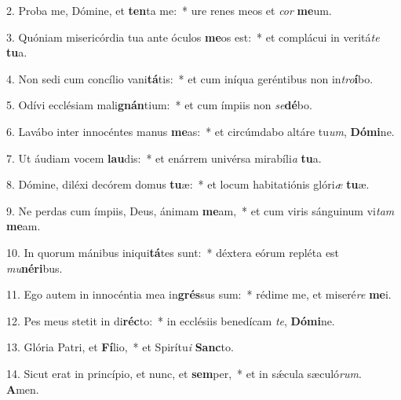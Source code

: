 2. Proba me, Dómine, et \textbf{ten}ta me:~*  ure renes meos et \textit{cor} \textbf{me}um.\

3. Quóniam misericórdia tua ante óculos \textbf{me}os est:~*  et complácui in veritá\textit{te} \textbf{tu}a.\

4. Non sedi cum concílio vani\textbf{tá}tis:~*  et cum iníqua geréntibus non in\textit{tro}\textbf{í}bo.\

5. Odívi ecclésiam mali\textbf{gnán}tium:~*  et cum ímpiis non \textit{se}\textbf{dé}bo.\

6. Lavábo inter innocéntes manus \textbf{me}as:~*  et circúmdabo altáre tu\textit{um}, \textbf{Dó}\textbf{mi}ne.\

7. Ut áudiam vocem \textbf{lau}dis:~*  et enárrem univérsa mirabíli\textit{a} \textbf{tu}a.\

8. Dómine, diléxi decórem domus \textbf{tu}æ:~*  et locum habitatiónis glóri\textit{æ} \textbf{tu}æ.\

9. Ne perdas cum ímpiis, Deus, ánimam \textbf{me}am,~*  et cum viris sánguinum vi\textit{tam} \textbf{me}am.\

10. In quorum mánibus iniqui\textbf{tá}tes sunt:~*  déxtera eórum repléta est \textit{mu}\textbf{né}\textbf{ri}bus.\

11. Ego autem in innocéntia mea in\textbf{grés}sus sum:~*  rédime me, et miseré\textit{re} \textbf{me}i.\

12. Pes meus stetit in di\textbf{réc}to:~*  in ecclésiis benedícam \textit{te}, \textbf{Dó}\textbf{mi}ne.\

13. Glória Patri, et \textbf{Fí}lio,~*  et Spirítu\textit{i} \textbf{Sanc}to.\

14. Sicut erat in princípio, et nunc, et \textbf{sem}per,~*  et in sǽcula sæculó\textit{rum}. \textbf{A}men.\

